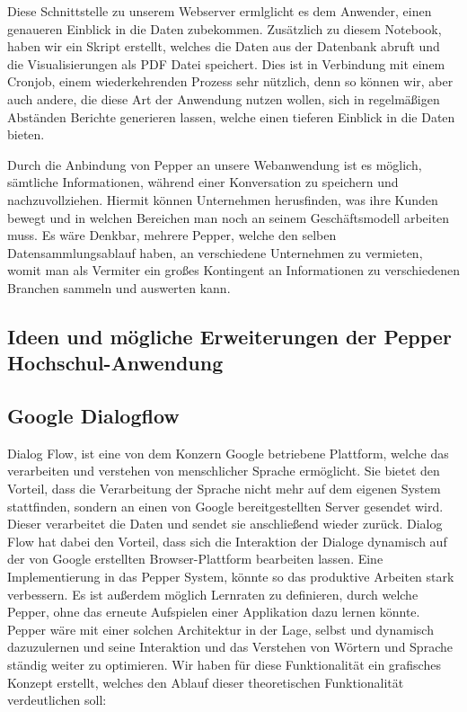 Diese Schnittstelle zu unserem Webserver ermlglicht es dem Anwender, einen genaueren Einblick in die Daten zubekommen.
Zusätzlich zu diesem Notebook, haben wir ein Skript erstellt, welches die Daten aus der Datenbank abruft und die Visualisierungen
als PDF Datei speichert. Dies ist in Verbindung mit einem Cronjob, einem wiederkehrenden Prozess sehr nützlich, denn
so können wir, aber auch andere, die diese Art der Anwendung nutzen wollen, sich in regelmäßigen Abständen
Berichte generieren lassen, welche einen tieferen Einblick in die Daten bieten.

Durch die Anbindung von Pepper an unsere Webanwendung ist es möglich, sämtliche Informationen,
während einer Konversation zu speichern und nachzuvollziehen. Hiermit können Unternehmen
herusfinden, was ihre Kunden bewegt und in welchen Bereichen man noch an seinem
Geschäftsmodell arbeiten muss. Es wäre Denkbar, mehrere Pepper, welche den selben Datensammlungsablauf haben,
an verschiedene Unternehmen zu vermieten, womit man als Vermiter ein großes Kontingent an
Informationen zu verschiedenen Branchen sammeln und auswerten kann.

\subsection{Ideen und mögliche Erweiterungen der Pepper Hochschul-Anwendung}

\subsection{Google Dialogflow}

Dialog Flow, ist eine von dem Konzern Google betriebene Plattform, welche das verarbeiten und verstehen von menschlicher Sprache ermöglicht. Sie bietet den Vorteil, dass die Verarbeitung der Sprache nicht mehr auf dem eigenen System stattfinden, sondern an einen von Google bereitgestellten Server gesendet wird. Dieser verarbeitet die Daten und sendet sie anschließend wieder zurück. Dialog Flow hat dabei den Vorteil, dass sich die Interaktion der Dialoge dynamisch auf der von Google erstellten Browser-Plattform bearbeiten lassen. Eine Implementierung in das Pepper System, könnte so das produktive Arbeiten stark verbessern. Es ist außerdem möglich Lernraten zu definieren, durch welche Pepper, ohne das erneute Aufspielen einer Applikation dazu lernen könnte. Pepper wäre mit einer solchen Architektur in der Lage, selbst und dynamisch dazuzulernen und seine Interaktion und das Verstehen von Wörtern und Sprache ständig weiter zu optimieren.
Wir haben für diese Funktionalität ein grafisches Konzept erstellt, welches den Ablauf dieser theoretischen Funktionalität verdeutlichen soll:

